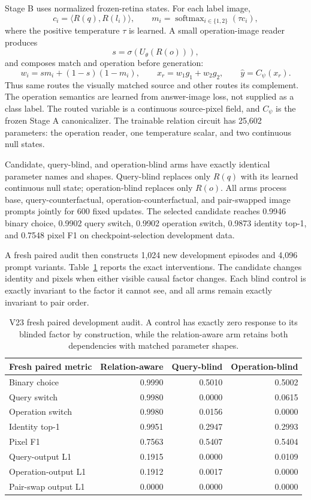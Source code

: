 \documentclass[11pt]{article}
\begin{document}
Stage B uses normalized frozen-retina states. For each label image,
\[
c_i=\langle R(q),R(l_i)\rangle,\qquad
m_i=\operatorname{softmax}_{i\in\{1,2\}}(\tau c_i),
\]
where the positive temperature $\tau$ is learned. A small operation-image
reader produces
\[
s=\sigma(U_\theta(R(o))),
\]
and composes match and operation before generation:
\[
w_i=s m_i+(1-s)(1-m_i),\qquad
x_r=w_1g_1+w_2g_2,\qquad
\hat y=C_\psi(x_r).
\]
Thus same routes the visually matched source and other routes its complement.
The operation semantics are learned from answer-image loss, not supplied as a
class label. The routed variable is a continuous source-pixel field, and
$C_\psi$ is the frozen Stage A canonicalizer. The trainable relation circuit
has 25,602 parameters: the operation reader, one temperature scalar, and two
continuous null states.

Candidate, query-blind, and operation-blind arms have exactly identical
parameter names and shapes. Query-blind replaces only $R(q)$ with its learned
continuous null state; operation-blind replaces only $R(o)$. All arms process
base, query-counterfactual, operation-counterfactual, and pair-swapped image
prompts jointly for 600 fixed updates. The selected candidate reaches 0.9946
binary choice, 0.9902 query switch, 0.9902 operation switch, 0.9873 identity
top-1, and 0.7548 pixel F1 on checkpoint-selection development data.

A fresh paired audit then constructs 1,024 new development episodes and 4,096
prompt variants. Table~\ref{tab:v23paired} reports the exact interventions. The
candidate changes identity and pixels when either visible causal factor changes.
Each blind control is exactly invariant to the factor it cannot see, and all
arms remain exactly invariant to pair order.

\begin{table}[t]
\centering
\small
\begin{tabular}{lrrr}
\toprule
Fresh paired metric & Relation-aware & Query-blind & Operation-blind \\
\midrule
Binary choice & 0.9990 & 0.5010 & 0.5002 \\
Query switch & 0.9980 & 0.0000 & 0.0615 \\
Operation switch & 0.9980 & 0.0156 & 0.0000 \\
Identity top-1 & 0.9951 & 0.2947 & 0.2993 \\
Pixel F1 & 0.7563 & 0.5407 & 0.5404 \\
Query-output L1 & 0.1915 & 0.0000 & 0.0109 \\
Operation-output L1 & 0.1912 & 0.0017 & 0.0000 \\
Pair-swap output L1 & 0.0000 & 0.0000 & 0.0000 \\
\bottomrule
\end{tabular}
\caption{V23 fresh paired development audit. A control has exactly zero
response to its blinded factor by construction, while the relation-aware arm
retains both dependencies with matched parameter shapes.}
\label{tab:v23paired}
\end{table}
\end{document}
